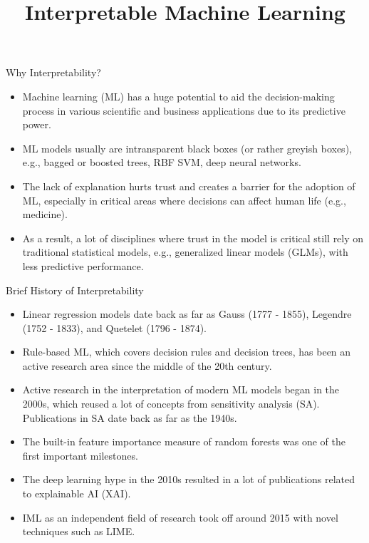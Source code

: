 \documentclass[11pt,compress,t,notes=noshow, xcolor=table]{beamer}
\title{Interpretable Machine Learning}
\institute{\href{https://compstat-lmu.github.io/lecture_iml/}{compstat-lmu.github.io/lecture\_iml}}
\date{}
\begin{document}






\begin{vbframe}{Why Interpretability?}

\begin{itemize}
  \item  Machine learning (ML) has a huge potential to aid the decision-making process in various scientific and business applications due to its predictive power.
  \item ML models usually are intransparent black boxes (or rather greyish boxes), 
  e.g., bagged or boosted trees, RBF SVM, deep neural networks.
  \item The lack of explanation hurts trust and creates a barrier for the adoption of ML, especially in critical areas where decisions can affect human life (e.g., medicine).
  \item As a result, a lot of disciplines where trust in the model is critical still rely on traditional statistical models, e.g., generalized linear models (GLMs), with less predictive performance.
\end{itemize}

\end{vbframe}



\begin{vbframe}{Brief History of Interpretability}
\begin{itemize}
\item Linear regression models date back as far as Gauss (1777 - 1855), Legendre (1752 - 1833), and Quetelet (1796 - 1874).
\item Rule-based ML, which covers decision rules and decision trees, has been an active research area since the middle of the 20th century.
\item Active research in the interpretation of modern ML models began in the 2000s, which reused a lot of concepts from sensitivity analysis (SA). Publications in SA date back as far as the 1940s.
\item The built-in feature importance measure of random forests was one of the first important milestones.
\item The deep learning hype in the 2010s resulted in a lot of publications related to explainable AI (XAI).
\item IML as an independent field of research took off around 2015 with novel techniques such as LIME. 
\end{itemize}
\end{vbframe}
\end{document}
